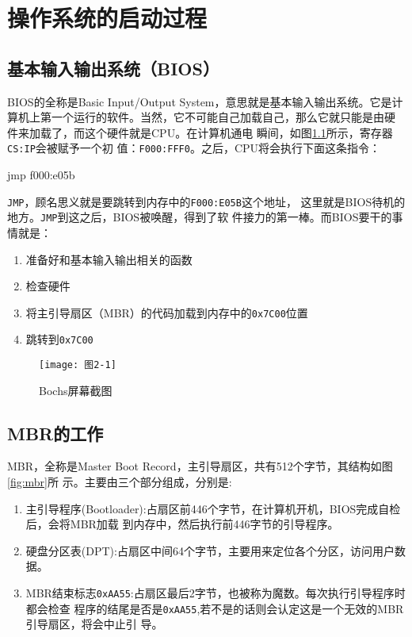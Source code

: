 \chapter{操作系统的启动过程}
\label{cha:OSboot}

\section{基本输入输出系统（BIOS）}
\label{sec:BIOS}

BIOS的全称是Basic Input/Output System，意思就是基本输入输出系统。它是计
算机上第一个运行的软件。当然，它不可能自己加载自己，那么它就只能是由硬
件来加载了，而这个硬件就是CPU\cite{zg2016}。在计算机通电
瞬间，如图\ref{fig:img2-1}所示，寄存器\texttt{CS:IP}会被赋予一个初
值：\texttt{F000:FFF0}。之后，CPU将会执行下面这条指令：
\begin{codeblock}
\begin{nasmcode}
jmp f000:e05b
\end{nasmcode}
\end{codeblock}
\texttt{JMP}，顾名思义就是要跳转到内存中的\texttt{F000:E05B}这个地址，
这里就是BIOS待机的地方。\texttt{JMP}到这之后，BIOS被唤醒，得到了软
件接力的第一棒。而BIOS要干的事情就是：
\begin{enumerate}
\item 准备好和基本输入输出相关的函数
\item 检查硬件
\item 将主引导扇区（MBR）的代码加载到内存中的\texttt{0x7C00}位置
\item 跳转到\texttt{0x7C00}
\end{enumerate}

\begin{figure}[H]
  \centering
  \texttt{[image: 图2-1]}  
  \caption{Bochs屏幕截图}
  \label{fig:img2-1}
\end{figure}

\section{MBR的工作}
\label{sec:MBR}

MBR，全称是Master Boot Record，主引导扇区，共有512个字节，其结构如图\ref{fig:mbr}所
示。主要由三个部分组成，分别是:
\begin{enumerate}
\item 主引导程序(Bootloader):占扇区前446个字节，在计算机开机，BIOS完成自检后，会将MBR加载
  到内存中，然后执行前446字节的引导程序。
\item 硬盘分区表(DPT):占扇区中间64个字节，主要用来定位各个分区，访问用户数据。
\item MBR结束标志\texttt{0xAA55}:占扇区最后2字节，也被称为魔数。每次执行引导程序时都会检查
  程序的结尾是否是\texttt{0xAA55},若不是的话则会认定这是一个无效的MBR引导扇区，将会中止引
  导。
\end{enumerate}

